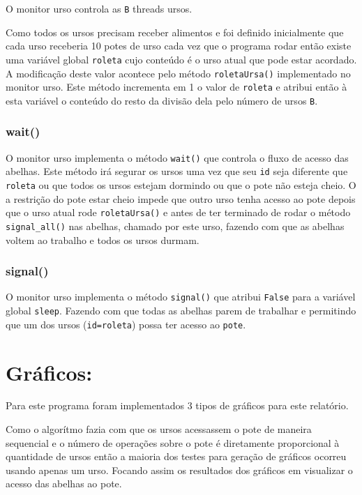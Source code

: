\documentclass[12pt,a4paper]{article}
\begin{document}
O monitor urso controla as \verb+B+ threads ursos.

Como todos os ursos precisam receber alimentos e foi definido inicialmente que cada urso receberia 10 potes de urso cada vez que o programa rodar então existe uma variável global \verb+roleta+ cujo conteúdo é o urso atual que pode estar acordado. A modificação deste valor acontece pelo método \verb+roletaUrsa()+ implementado no monitor urso. Este método incrementa em 1 o valor de \verb+roleta+ e atribui então à esta variável o conteúdo do resto da divisão dela pelo número de ursos \verb+B+.

\subsubsection{wait()}

O monitor urso implementa o método \verb+wait()+ que controla o fluxo de acesso das abelhas. Este método irá segurar os ursos uma vez que seu \verb+id+ seja diferente que \verb+roleta+ ou que todos os ursos estejam dormindo ou que o pote não esteja cheio. O a restrição do pote estar cheio impede que outro urso tenha acesso ao pote depois que o urso atual rode \verb+roletaUrsa()+ e antes de ter terminado de rodar o método \verb+signal_all()+ nas abelhas, chamado por este urso, fazendo com que as abelhas voltem ao trabalho e todos os ursos durmam.

\subsubsection{signal()}

O monitor urso implementa o método \verb+signal()+ que atribui \verb+False+ para a variável global \verb+sleep+. Fazendo com que todas as abelhas parem de trabalhar e permitindo que um dos ursos (\verb+id=roleta+) possa ter acesso ao \verb+pote+.

\section{Gráficos:}

Para este programa foram implementados 3 tipos de gráficos para este relatório.

Como o algorítmo fazia com que os ursos acessassem o pote de maneira sequencial e o número de operações sobre o pote é diretamente proporcional à quantidade de ursos então a maioria dos testes para geração de gráficos ocorreu usando apenas um urso. Focando assim os resultados dos gráficos em visualizar o acesso das abelhas ao pote.
\end{document}
